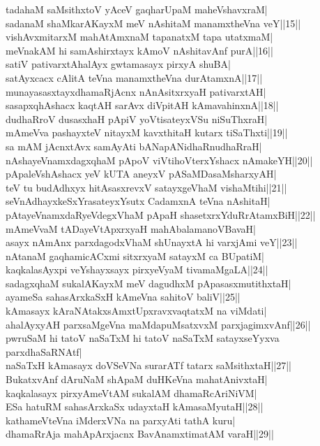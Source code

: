 \documentclass{article}
\begin{document}
tadahaM saMsithxtoV yAceV gaqharUpaM maheVshavxraM|\\
sadanaM shaMkarAKayxM meV nAshitaM manamxtheVna veY||15||\\
vishAvxmitarxM mahAtAmxnaM tapanatxM tapa utatxmaM|\\
meVnakAM hi samAshirxtayx kAmoV nAshitavAnf purA||16||\\
satiV pativarxtAhalAyx gwtamasayx pirxyA shuBA|\\
satAyxcacx cAlitA teVna manamxtheVna durAtamxnA||17||\\
munayasasxtayxdhamaRjAcnx nAnAsitxrxyaH pativarxtAH|\\
sasapxqhAshacx kaqtAH sarAvx diVpitAH kAmavahinxnA||18||\\
dudhaRroV dusasxhaH pApiV yoVtisateyxVSu niSuThxraH|\\
mAmeVva pashayxteV nitayxM kavxthitaH kutarx tiSaThxti||19||\\
sa mAM jAcnxtAvx samAyAti bANapANidhaRnudhaRraH|\\
nAshayeVnamxdagxqhaM pApoV viVtihoVterxYshacx nAmakeYH||20||\\
pApaleVshAshacx yeV kUTA aneyxV pASaMDasaMsharxyAH|\\
teV tu budAdhxyx hitAsasxrevxV satayxgeVhaM vishaMtihi||21||\\
seVnAdhayxkeSxYrasateyxYsutx CadamxnA teVna nAshitaH|\\
pAtayeVnamxdaRyeVdegxVhaM pApaH shasetxrxYduRrAtamxBiH||22||\\
mAmeVvaM tADayeVtApxrxyaH mahAbalamanoVBavaH|\\
asayx nAmAnx parxdagodxVhaM shUnayxtA hi varxjAmi veY||23||\\
nAtanaM gaqhamicACxmi sitxrxyaM satayxM ca BUpatiM|\\
kaqkalasAyxpi veYshayxsayx pirxyeVyaM tivamaMgaLA||24||\\
sadagxqhaM sukalAKayxM meV dagudhxM pApasasxmutithxtaH|\\
ayameSa sahasArxkaSxH kAmeVna sahitoV baliV||25||\\
kAmasayx kAraNAtakxsAmxtUpxravxvaqtatxM na viMdati|\\
ahalAyxyAH parxsaMgeVna maMdapuMsatxvxM parxjagimxvAnf||26||\\
pwruSaM hi tatoV naSaTxM hi tatoV naSaTxM satayxseYyxva parxdhaSaRNAtf|\\
naSaTxH kAmasayx doVSeVNa surarATf tatarx saMsithxtaH||27||\\
BukatxvAnf dAruNaM shApaM duHKeVna mahatAnivxtaH|\\
kaqkalasayx pirxyAmeVtAM sukalAM dhamaRcAriNiVM|\\
ESa hatuRM sahasArxkaSx udayxtaH kAmasaMyutaH||28||\\
kathameVteVna iMderxVNa na parxyAti tathA kuru|\\
dhamaRrAja mahApArxjacnx BavAnamxtimatAM varaH||29||\\
\end{document}
